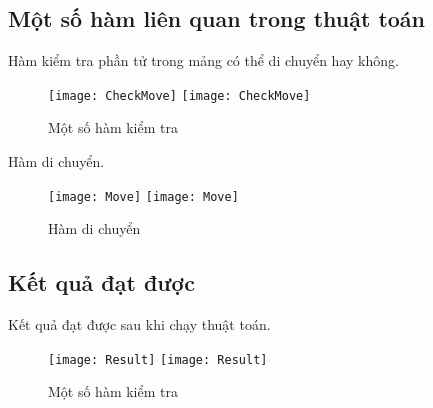\subsection{Một số hàm liên quan trong thuật toán}
Hàm kiểm tra phần tử trong mảng có thể di chuyển hay không.\\
\begin{figure}[!htbp]
  \begin{center}
    \leavevmode
    \ifpdf
      \texttt{[image: CheckMove]}
    \else
      \texttt{[image: CheckMove]}
    \fi
    \caption{Một số hàm kiểm tra}
    \label{FigAir}
   
  \end{center}
\end{figure}
\FloatBarrier
Hàm di chuyển.\\
\begin{figure}[!htbp]
  \begin{center}
    \leavevmode
    \ifpdf
      \texttt{[image: Move]}
    \else
      \texttt{[image: Move]}
    \fi
    \caption{Hàm di chuyển}
    \label{FigAir}
   
  \end{center}
\end{figure}
\FloatBarrier
\subsection{Kết quả đạt được}
Kết quả đạt được sau khi chạy thuật toán.\\
\begin{figure}[!htbp]
  \begin{center}
    \leavevmode
    \ifpdf
      \texttt{[image: Result]}
    \else
      \texttt{[image: Result]}
    \fi
    \caption{Một số hàm kiểm tra}
    \label{FigAir}
   
  \end{center}
\end{figure}
\FloatBarrier

